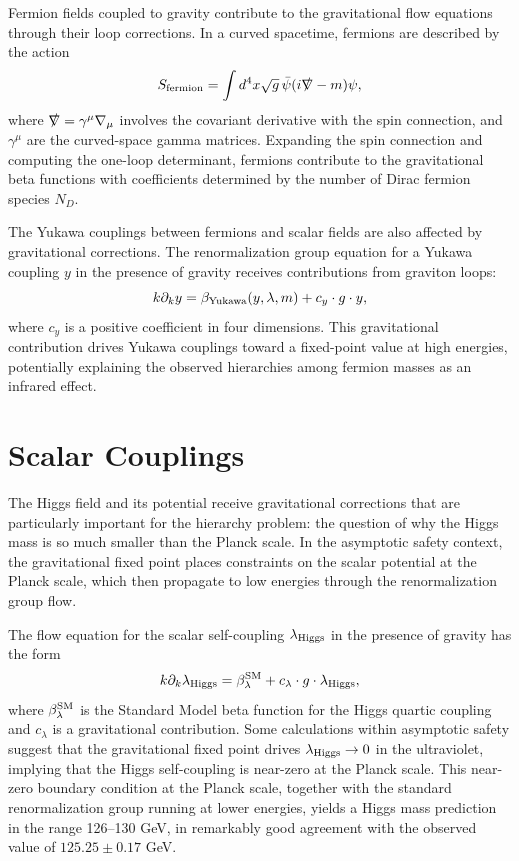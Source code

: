 \documentclass[11pt, twoside, openright]{book}
\theoremstyle{dotted}
\theoremstyle{definition}
\newcommand{\kdk}{k\partial_k}         %
\begin{document}
Fermion fields coupled to gravity contribute to the gravitational flow equations
through their loop corrections. In a curved spacetime, fermions are described by
the action
\begin{equation}
  S_{\rm fermion} = \int d^4x \sqrt{g} \, \bar\psi(i\slashed{\nabla} - m)\psi,
  \label{eq:fermion_action}
\end{equation}
where $\slashed{\nabla} = \gamma^\mu\nabla_\mu$ involves the covariant derivative
with the spin connection, and $\gamma^\mu$ are the curved-space gamma matrices.
Expanding the spin connection and computing the one-loop determinant, fermions
contribute to the gravitational beta functions with coefficients determined by the
number of Dirac fermion species $N_D$.

The Yukawa couplings between fermions and scalar fields are also affected by
gravitational corrections. The renormalization group equation for a Yukawa coupling
$y$ in the presence of gravity receives contributions from graviton loops:
\begin{equation}
  \kdk y = \beta_{\rm Yukawa}(y, \lambda, m) + c_y \cdot g \cdot y,
  \label{eq:yukawa_gravity_rge}
\end{equation}
where $c_y$ is a positive coefficient in four dimensions. This gravitational
contribution drives Yukawa couplings toward a fixed-point value at high energies,
potentially explaining the observed hierarchies among fermion masses as an
infrared effect.

\section{Scalar Couplings}

The Higgs field and its potential receive gravitational corrections that are
particularly important for the hierarchy problem: the question of why the Higgs
mass is so much smaller than the Planck scale. In the asymptotic safety context,
the gravitational fixed point places constraints on the scalar potential at the
Planck scale, which then propagate to low energies through the renormalization
group flow.

The flow equation for the scalar self-coupling $\lambda_{\rm Higgs}$ in the presence
of gravity has the form
\begin{equation}
  \kdk\lambda_{\rm Higgs} = \beta_\lambda^{\rm SM} + c_\lambda \cdot g \cdot \lambda_{\rm Higgs},
  \label{eq:higgs_gravity_rge}
\end{equation}
where $\beta_\lambda^{\rm SM}$ is the Standard Model beta function for the Higgs
quartic coupling and $c_\lambda$ is a gravitational contribution. Some calculations
within asymptotic safety suggest that the gravitational fixed point drives
$\lambda_{\rm Higgs} \to 0$ in the ultraviolet, implying that the Higgs self-coupling
is near-zero at the Planck scale. This near-zero boundary condition at the Planck
scale, together with the standard renormalization group running at lower energies,
yields a Higgs mass prediction in the range 126--130 GeV, in remarkably good
agreement with the observed value of $125.25 \pm 0.17$ GeV.
\end{document}
